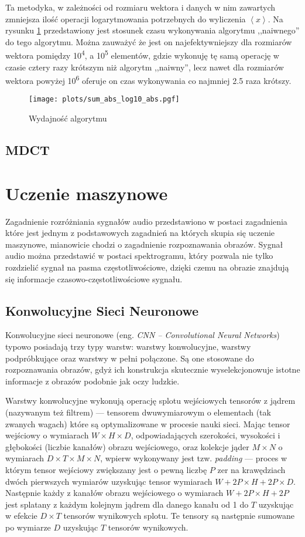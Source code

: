\documentclass[pl,12pt]{aghdpl}
\let\Oldsection\section%
\renewcommand{\section}{\FloatBarrier\Oldsection}
\let\Oldsubsection\subsection%
\renewcommand{\subsection}{\FloatBarrier\Oldsubsection}
\begin{document}
Ta metodyka, w zależności od rozmiaru wektora i danych w nim zawartych
zmniejsza ilość operacji logarytmowania potrzebnych do wyliczenia
$\left<x\right>$. Na rysunku \ref{fig:sum_abs_log_abs} przedstawiony jest
stosunek czasu wykonywania algorytmu ,,naiwnego'' do tego algorytmu. Można
zauważyć że jest on najefektywniejszy dla rozmiarów wektora pomiędzy
10\textsuperscript{4}, a 10\textsuperscript{5} elementów, gdzie wykonuję tę samą
operację w czasie cztery razy krótszym niż algorytm ,,naiwny'', lecz nawet dla
rozmiarów wektora powyżej 10\textsuperscript{6} oferuje on czas wykonywania co
najmniej \num{2.5} raza krótszy.
\begin{figure}[!tbh]
  \centering
  \texttt{[image: plots/sum\_abs\_log10\_abs.pgf]}
  \caption{Wydajność algorytmu}
  \label{fig:sum_abs_log_abs}
\end{figure}

\subsection{MDCT}
\section{Uczenie maszynowe}
Zagadnienie rozróżniania sygnałów audio przedstawiono w postaci zagadnienia
które jest jednym z podstawowych zagadnień na których skupia się uczenie
maszynowe, mianowicie chodzi o zagadnienie rozpoznawania obrazów. Sygnał audio
można przedstawić w postaci spektrogramu, który pozwala nie tylko rozdzielić
sygnał na pasma częstotliwościowe, dzięki czemu na obrazie znajdują się
informacje czasowo-częstotliwościowe sygnału.
\subsection{Konwolucyjne Sieci Neuronowe}
Konwolucyjne sieci neuronowe (eng. \textit{CNN -- Convolutional Neural
Networks}) typowo posiadają trzy typy warstw: warstwy konwolucyjne,
warstwy podpróbkujące oraz warstwy w pełni połączone. Są one stosowane do
rozpoznawania obrazów, gdyż ich konstrukcja skutecznie wyselekcjonowuje istotne
informacje z obrazów podobnie jak oczy ludzkie.

Warstwy konwolucyjne wykonują operację splotu wejściowych tensorów z jądrem
(nazywanym też filtrem) --- tensorem dwuwymiarowym o elementach (tak zwanych
wagach) które są optymalizowane w procesie nauki sieci. Mając tensor wejściowy
o wymiarach $W \times H \times D$, odpowiadających szerokości, wysokości i
głębokości (liczbie kanałów) obrazu wejściowego, oraz kolekcje jąder $M \times
N$ o wymiarach $D \times T \times M \times N$, wpierw wykonywany jest tzw.
\textit{padding} --- proces w którym tensor wejściowy zwiększany jest o pewną
liczbę $P$ zer na krawędziach dwóch pierwszych wymiarów uzyskując tensor
wymiarach $W+2P \times H+2P \times D$. Następnie każdy z kanałów obrazu
wejściowego o wymiarach $W+2P \times H+2P$ jest splatany z każdym kolejnym
jądrem dla danego kanału od 1 do $T$ uzyskując w efekcie $D\times T$ tensorów
wynikowych splotu. Te tensory są następnie sumowane po wymiarze $D$ uzyskując
$T$ tensorów wynikowych.
\end{document}
